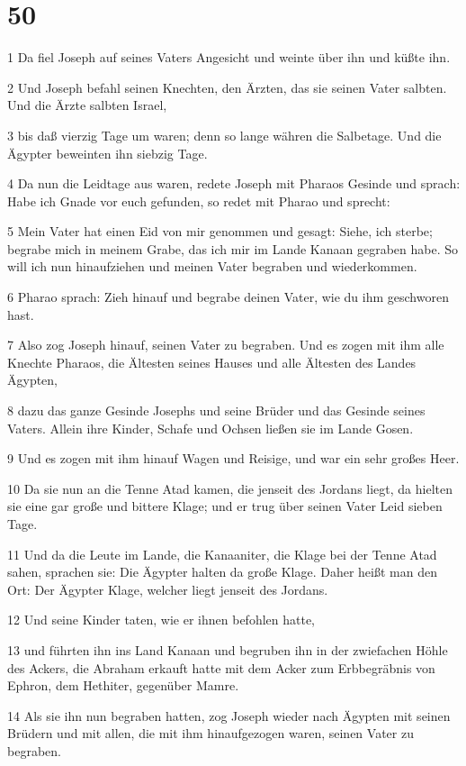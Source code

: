 \chapter{50}

\par 1 Da fiel Joseph auf seines Vaters Angesicht und weinte über ihn und küßte ihn.
\par 2 Und Joseph befahl seinen Knechten, den Ärzten, das sie seinen Vater salbten. Und die Ärzte salbten Israel,
\par 3 bis daß vierzig Tage um waren; denn so lange währen die Salbetage. Und die Ägypter beweinten ihn siebzig Tage.
\par 4 Da nun die Leidtage aus waren, redete Joseph mit Pharaos Gesinde und sprach: Habe ich Gnade vor euch gefunden, so redet mit Pharao und sprecht:
\par 5 Mein Vater hat einen Eid von mir genommen und gesagt: Siehe, ich sterbe; begrabe mich in meinem Grabe, das ich mir im Lande Kanaan gegraben habe. So will ich nun hinaufziehen und meinen Vater begraben und wiederkommen.
\par 6 Pharao sprach: Zieh hinauf und begrabe deinen Vater, wie du ihm geschworen hast.
\par 7 Also zog Joseph hinauf, seinen Vater zu begraben. Und es zogen mit ihm alle Knechte Pharaos, die Ältesten seines Hauses und alle Ältesten des Landes Ägypten,
\par 8 dazu das ganze Gesinde Josephs und seine Brüder und das Gesinde seines Vaters. Allein ihre Kinder, Schafe und Ochsen ließen sie im Lande Gosen.
\par 9 Und es zogen mit ihm hinauf Wagen und Reisige, und war ein sehr großes Heer.
\par 10 Da sie nun an die Tenne Atad kamen, die jenseit des Jordans liegt, da hielten sie eine gar große und bittere Klage; und er trug über seinen Vater Leid sieben Tage.
\par 11 Und da die Leute im Lande, die Kanaaniter, die Klage bei der Tenne Atad sahen, sprachen sie: Die Ägypter halten da große Klage. Daher heißt man den Ort: Der Ägypter Klage, welcher liegt jenseit des Jordans.
\par 12 Und seine Kinder taten, wie er ihnen befohlen hatte,
\par 13 und führten ihn ins Land Kanaan und begruben ihn in der zwiefachen Höhle des Ackers, die Abraham erkauft hatte mit dem Acker zum Erbbegräbnis von Ephron, dem Hethiter, gegenüber Mamre.
\par 14 Als sie ihn nun begraben hatten, zog Joseph wieder nach Ägypten mit seinen Brüdern und mit allen, die mit ihm hinaufgezogen waren, seinen Vater zu begraben.
